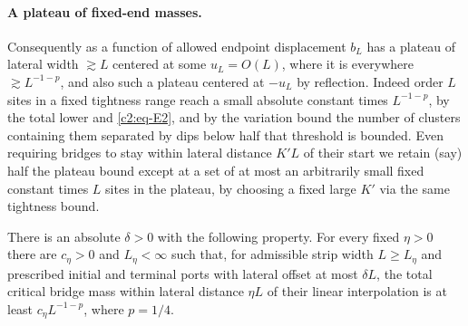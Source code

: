 \paragraph{A plateau of fixed-end masses.}
Consequently as a function of allowed endpoint displacement \(b_L\) has a plateau of lateral width \(\gtrsim L\) centered at some \(u_L=O(L)\), where it is everywhere \(\gtrsim L^{-1-p}\), and also such a plateau centered at \(-u_L\) by reflection. Indeed order \(L\) sites in a fixed tightness range reach a small absolute constant times \(L^{-1-p}\), by the total lower and \eqref{c2:eq-E2}, and by the variation bound the number of clusters containing them separated by dips below half that threshold is bounded. Even requiring bridges to stay within lateral distance \(K' L\) of their start we retain (say) half the plateau bound except at a set of at most an arbitrarily small fixed constant times \(L\) sites in the plateau, by choosing a fixed large \(K'\) via the same tightness bound.

\begin{lemma}
\label{lem:pd:tube}
There is an absolute $\delta>0$ with the following property.  For every
fixed $\eta>0$ there are $c_\eta>0$ and $L_\eta<\infty$ such that, for
admissible strip width $L\ge L_\eta$ and prescribed initial and terminal
ports with lateral offset at most $\delta L$, the total critical bridge
mass within lateral distance $\eta L$ of their linear interpolation is
at least $c_\eta L^{-1-p}$, where $p=1/4$.
\end{lemma}

